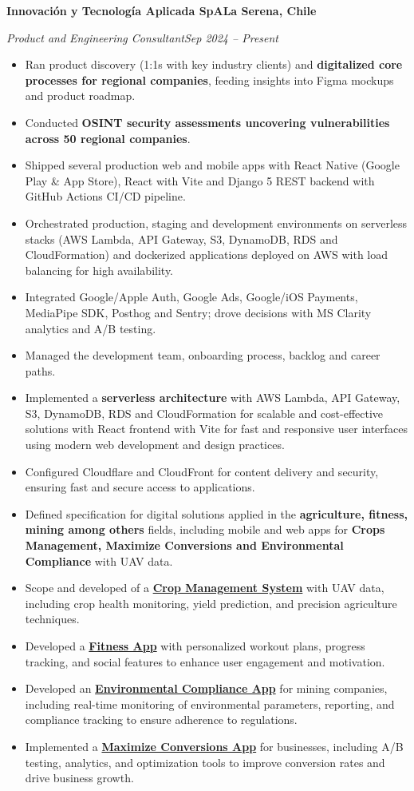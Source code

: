 \documentclass[11pt,a4paper]{article}
\newcommand{\entry}[4]{%
  \textbf{#1}\hfill\textbf{#2}\par
  \textit{#3}\hfill\textit{#4}\par\vspace{2pt}%
}
\begin{document}
\entry{Innovaci\'on y Tecnolog\'ia Aplicada SpA}{La Serena, Chile}{Product and Engineering Consultant}{Sep 2024 -- Present}
\begin{itemize}
  \item Ran product discovery (1:1s with key industry clients) and \textbf{digitalized core processes
        for regional companies}, feeding insights into Figma mockups and product roadmap.
  \item Conducted \textbf{OSINT security assessments uncovering vulnerabilities across 50 regional
        companies}.
  \item Shipped several production web and mobile apps with React Native (Google Play \& App Store), React with Vite and
        Django 5 REST backend with GitHub Actions CI/CD pipeline.
        \item Orchestrated production, staging and development environments on serverless stacks (AWS Lambda, API Gateway, S3, DynamoDB, RDS and CloudFormation) and dockerized applications deployed on AWS with load balancing for high availability.
  \item Integrated Google/Apple Auth, Google Ads, Google/iOS Payments, MediaPipe SDK, Posthog and Sentry;
        drove decisions with MS Clarity analytics and A/B testing.
  \item Managed the development team, onboarding process, backlog and career paths.
        \item Implemented a \textbf{serverless architecture} with AWS Lambda, API Gateway, S3, DynamoDB, RDS and CloudFormation for scalable and cost-effective solutions with React
        frontend with Vite for fast and responsive user interfaces using modern web development and design practices.
        \item Configured Cloudflare and CloudFront for content delivery and security, ensuring fast and secure access to applications.
      \item Defined specification for digital solutions applied in the \textbf{agriculture, fitness, mining among others} fields, including
        mobile and web apps for \textbf{Crops Management, Maximize Conversions and Environmental Compliance} with UAV data.
      \item Scope and developed of a \href{https://amissionhub.com}{\textbf{Crop Management System}} with UAV data, including crop health monitoring, yield prediction, and precision agriculture techniques.
      \item Developed a \href{https://dev.blou.club/}{\textbf{Fitness App}} with personalized workout plans, progress tracking, and social features to enhance user engagement and motivation.
      \item Developed an \href{https://chemical2.com/}{\textbf{Environmental Compliance App}} for mining companies, including real-time monitoring of environmental parameters, reporting, and compliance tracking to ensure adherence to regulations.
      \item Implemented a \href{https://dev.blou.club/}{\textbf{Maximize Conversions App}} for businesses, including A/B testing, analytics, and optimization tools to improve conversion rates and drive business growth.
\end{itemize}
\end{document}
